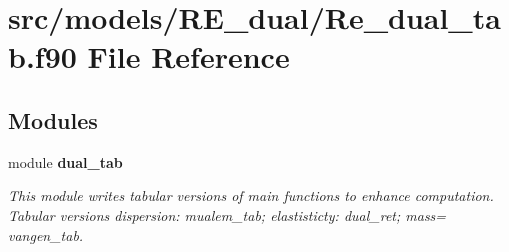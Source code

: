 \section{src/models/\+R\+E\+\_\+dual/\+Re\+\_\+dual\+\_\+tab.f90 File Reference}
\label{_re__dual__tab_8f90}
\subsection*{Modules}
\begin{DoxyCompactItemize}
\item 
module {\bf dual\+\_\+tab}
\begin{DoxyCompactList}\small\item\em This module writes tabular versions of main functions to enhance computation. ~\newline
 Tabular versions dispersion\+: mualem\+\_\+tab; elastisticty\+: dual\+\_\+ret; mass= vangen\+\_\+tab. \end{DoxyCompactList}\end{DoxyCompactItemize}
